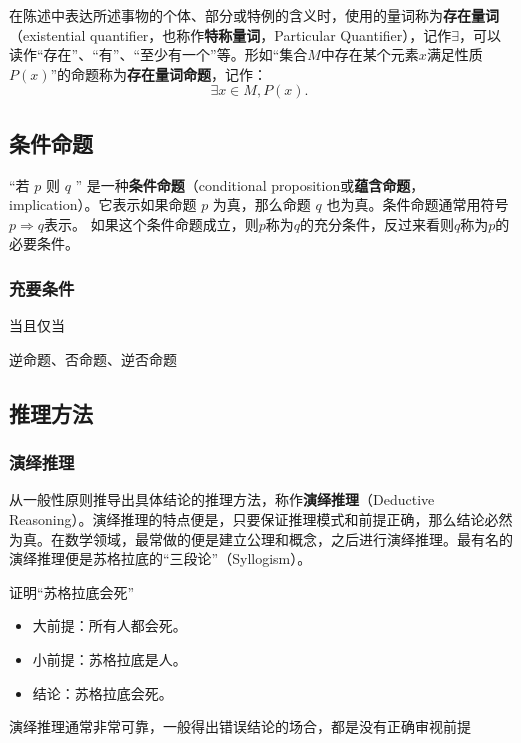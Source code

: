 在陈述中表达所述事物的个体、部分或特例的含义时，使用的量词称为\textbf{存在量词}（existential quantifier，也称作\textbf{特称量词}，Particular Quantifier），记作$\exists$，可以读作“存在”、“有”、“至少有一个”等。形如“集合$M$中存在某个元素$x$满足性质$P(x)$”的命题称为\textbf{存在量词命题}，记作：
\begin{equation}
\exists x\in M,P(x).~
\end{equation}

\subsection{条件命题}
“若  $p$  则  $q$ ” 是一种\textbf{条件命题}（conditional proposition或\textbf{蕴含命题}，implication）。它表示如果命题  $p$  为真，那么命题  $q$  也为真。条件命题通常用符号$p\Rightarrow q$表示。
如果这个条件命题成立，则$p$称为$q$的充分条件，反过来看则$q$称为$p$的必要条件。

\subsubsection{充要条件}
当且仅当

逆命题、否命题、逆否命题

\subsection{推理方法}

\subsubsection{演绎推理}

从一般性原则推导出具体结论的推理方法，称作\textbf{演绎推理}（Deductive Reasoning）。演绎推理的特点便是，只要保证推理模式和前提正确，那么结论必然为真。在数学领域，最常做的便是建立公理和概念，之后进行演绎推理。最有名的演绎推理便是苏格拉底的“三段论”（Syllogism）。

\begin{example}{证明“苏格拉底会死”}
\begin{itemize}
\item 大前提：所有人都会死。
\item 小前提：苏格拉底是人。
\item 结论：苏格拉底会死。
\end{itemize}
\end{example}

演绎推理通常非常可靠，一般得出错误结论的场合，都是没有正确审视前提

